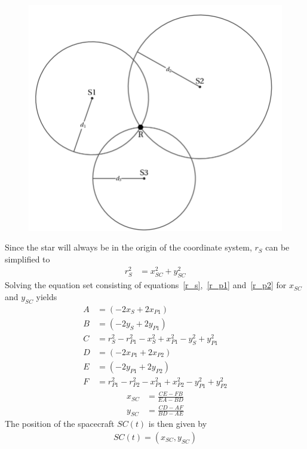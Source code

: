 \documentclass[reprint,english,notitlepage]{revtex4-2}
\begin{document}
\begin{figure}[h]
	\centering
	\includegraphics[scale=0.2]{Figures/trilateration}
	\label{fig:trilateration_figure} %
\end{figure}
Since the star will always be in the origin of the coordinate system, $r_S$ can be simplified to
\begin{align*}
    r_S^2 &= x_{SC}^2 + y_{SC}^2
\end{align*}
Solving the equation set consisting of equations~\eqref{r_s},~\eqref{r_p1} and~\eqref{r_p2} for $x_{SC}$ and $y_{SC}$ yields
\begin{align*}
    A& = \left(-2x_S + 2x_{P1}\right)\\
	B& = \left(-2y_S + 2y_{P1}\right)\\
	C& = r_S^2 - r_{P1}^2 - x_S^2 + x_{P1}^2 - y_S^2 + y_{P1}^2\\
	D& = \left(-2x_{P1} + 2x_{P2}\right)\\
	E& = \left(-2y_{P1} + 2y_{P2}\right)\\
	F& = r_{P1}^2 - r_{P2}^2 - x_{P1}^2 + x_{P2}^2 - y_{P1}^2 + y_{P2}^2
\end{align*}
\begin{align*}
    x_{SC}& = \frac{CE - FB}{EA - BD}\\
	y_{SC}& = \frac{CD - AF}{BD - AE}
\end{align*}
The position of the spacecraft $SC(t)$ is then given by
\begin{align*}
    SC(t) = \left(x_{SC}, y_{SC} \right)
\end{align*}
\end{document}
